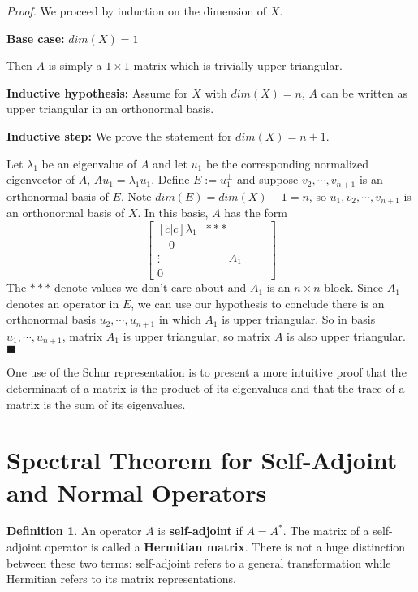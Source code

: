 \documentclass[a4paper,10pt]{book}
\theoremstyle{plain}
\renewenvironment{proof}{\textsl{Proof.}}{\hfill$\blacksquare$}
\theoremstyle{plain}
\theoremstyle{definition}
\newtheorem{definition}{Definition}[section]
\begin{document}
\begin{proof}
We proceed by induction on the dimension of $X$. 

\textbf{Base case:} $dim(X) = 1$

Then $A$ is simply a $1 \times 1$ matrix which is trivially upper triangular. 

\textbf{Inductive hypothesis:} Assume for $X$ with $dim(X) = n$, $A$ can be written as upper triangular in an orthonormal basis. 

\textbf{Inductive step:} We prove the statement for $dim(X) = n + 1$. 

Let $\lambda_{1}$ be an eigenvalue of $A$ and let $u_{1}$ be the corresponding normalized eigenvector of $A$, $Au_{1} = \lambda_{1} u_{1}$. Define $E := u_{1}^{\perp}$ and suppose $v_{2}, \cdots, v_{n + 1}$ is an orthonormal basis of $E$. Note $dim(E) = dim(X) - 1 = n$, so $u_{1}, v_{2}, \cdots, v_{n + 1}$ is an orthonormal basis of $X$. In this basis, $A$ has the form 
$$\begin{bmatrix}[c|c]
\lambda_{1} & *** \\
\hline 
\quad 0 \quad &  \\
\vdots & \qquad A_{1} \qquad \\
0 & 
\end{bmatrix}
$$
The $***$ denote values we don't care about and $A_{1}$ is an $n \times n$ block. Since $A_{1}$ denotes an operator in $E$, we can use our hypothesis to conclude there is an orthonormal basis $u_{2}, \cdots, u_{n + 1}$ in which $A_{1}$ is upper triangular. So in basis $u_{1}, \cdots, u_{n + 1}$, matrix $A_{1}$ is upper triangular, so matrix $A$ is also upper triangular.
\end{proof}

One use of the Schur representation is to present a more intuitive proof that the determinant of a matrix is the product of its eigenvalues and that the trace of a matrix is the sum of its eigenvalues. 


\section{Spectral Theorem for Self-Adjoint and Normal Operators}

\begin{definition}
An operator $A$ is \textbf{self-adjoint} if $A = A^{*}$. The matrix of a self-adjoint operator is called a \textbf{Hermitian matrix}. There is not a huge distinction between these two terms: self-adjoint refers to a general transformation while Hermitian refers to its matrix representations.
\end{definition}
\end{document}
